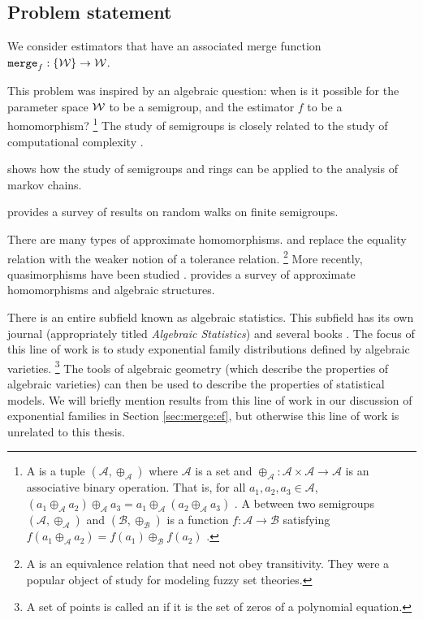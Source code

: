 \documentclass[thesis.tex]{subfiles}
\newcommand{\set}[1]{\mathcal {#1}}
\newcommand{\mappend}[1]{\oplus_{\set {#1}}}
\newcommand{\semigroup}[1]{(\set {#1}, \mappend {#1})}
\newcommand{\merge}{\mkprocedure{merge}}
\begin{document}

\subsection{Problem statement}

We consider estimators that have an associated merge function $\merge_f : \{\W\}\to\W$.

This problem was inspired by an algebraic question:
when is it possible for the parameter space ${\mathcal W}$ to be a semigroup,
and the estimator $f$ to be a homomorphism?%
\footnote{
A  is a tuple $\semigroup A$
where $\set A$ is a set and
$\mappend A : \set A \times \set A \to \set A$ is an associative binary operation.
That is, for all $a_1, a_2, a_3 \in \set A$, 
$(a_1 \mappend A a_2) \mappend A a_3 = a_1 \mappend A (a_2 \mappend A a_3)$
.
A  between two semigroups $\semigroup A$ and $\semigroup B$ is a function  $f: \set A \to \set B$ satisfying
$f(a_1 \mappend A a_2) = f(a_1) \mappend B f(a_2)$
.
}
The study of semigroups is closely related to the study of computational complexity
\citep{tesson2004monoids,tesson2006bridges}.

\citet{brown2004semigroup} shows how the study of semigroups and rings can be applied to the analysis of markov chains.

\citet{hildebrand2005survey} provides a survey of results on random walks on finite semigroups.

There are many types of approximate homomorphisms.
\citet{zelinka1970tolerance} and \citet{zelinka1975tolerance} replace the equality relation with the weaker notion of a tolerance relation.%
\footnote{
    A  is an equivalence relation that need not obey transitivity.
    They were a popular object of study for modeling fuzzy set theories.
}
More recently, quasimorphisms have been studied \citep{kotschick2004quasi}.
\citet{green2014approximate} provides a survey of approximate homomorphisms and algebraic structures.

There is an entire subfield known as algebraic statistics.
This subfield has its own journal (appropriately titled \emph{Algebraic Statistics}) 
and several books \citep{pachter2005algebraic,drton2008lectures,sullivant2017algebraic}.
The focus of this line of work is to study exponential family distributions defined by algebraic varieties.%
\footnote{
    A set of points is called an  if it is the set of zeros of a polynomial equation.
}
The tools of algebraic geometry (which describe the properties of algebraic varieties)
can then be used to describe the properties of statistical models.
We will briefly mention results from this line of work in our discussion of exponential families in Section \ref{sec:merge:ef},
but otherwise this line of work is unrelated to this thesis.
\end{document}

